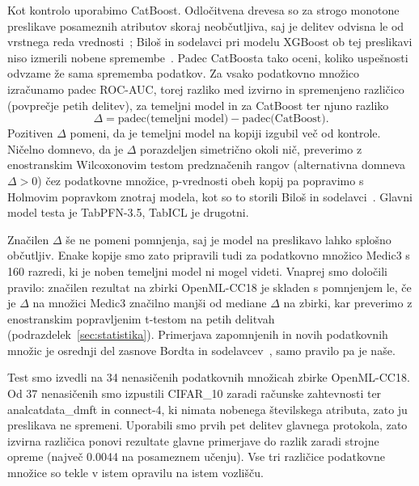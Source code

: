\documentclass[a4paper,12pt,openright]{book}
\begin{document}
Kot kontrolo uporabimo CatBoost. Odločitvena drevesa so za strogo monotone
preslikave posameznih atributov skoraj neobčutljiva, saj je delitev odvisna le
od vrstnega reda vrednosti~\cite{galili2016splitting}; Biloš in sodelavci pri
modelu XGBoost ob tej preslikavi niso izmerili nobene
spremembe~\cite{bilos2026mechanistic}. Padec CatBoosta tako oceni, koliko
uspešnosti odvzame že sama sprememba podatkov. Za vsako podatkovno množico
izračunamo padec ROC-AUC, torej razliko med izvirno in spremenjeno različico
(povprečje petih delitev), za temeljni model in za CatBoost ter njuno razliko
\[
\Delta = \text{padec(temeljni model)} - \text{padec(CatBoost)}.
\]
Pozitiven $\Delta$ pomeni, da je temeljni model na kopiji izgubil več od
kontrole. Ničelno domnevo, da je $\Delta$ porazdeljen simetrično okoli nič,
preverimo z enostranskim Wilcoxonovim testom predznačenih rangov (alternativna
domneva $\Delta > 0$) čez podatkovne množice, p-vrednosti obeh kopij pa
popravimo s Holmovim popravkom znotraj modela, kot so to storili Biloš in
sodelavci~\cite{bilos2026mechanistic}. Glavni model testa je TabPFN-3.5,
TabICL je drugotni.

Značilen $\Delta$ še ne pomeni pomnjenja, saj je model na preslikavo lahko
splošno občutljiv. Enake kopije smo zato pripravili tudi za podatkovno množico
Medic3 s 160 razredi, ki je noben temeljni model ni mogel videti. Vnaprej smo
določili pravilo: značilen rezultat na zbirki OpenML-CC18 je skladen s
pomnjenjem le, če je $\Delta$ na množici Medic3 značilno manjši od mediane
$\Delta$ na zbirki, kar preverimo z enostranskim popravljenim t-testom na
petih delitvah (podrazdelek~\ref{sec:statistika}). Primerjava zapomnjenih in
novih podatkovnih množic je osrednji del zasnove Bordta in
sodelavcev~\cite{bordt2024elephants}, samo pravilo pa je naše.

Test smo izvedli na 34 nenasičenih podatkovnih množicah zbirke OpenML-CC18. Od
37 nenasičenih smo izpustili CIFAR\_10 zaradi računske zahtevnosti ter
analcatdata\_dmft in connect-4, ki nimata nobenega številskega atributa, zato
ju preslikava ne spremeni. Uporabili smo prvih pet delitev glavnega protokola,
zato izvirna različica ponovi rezultate glavne primerjave do razlik zaradi
strojne opreme (največ \num{0.0044} na posameznem učenju). Vse tri različice
podatkovne množice so tekle v istem opravilu na istem vozlišču.
\end{document}
